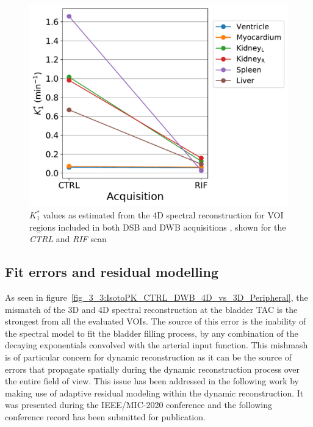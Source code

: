 \begin{figure} [h!]
\centering
\includegraphics[scale=0.5,angle=0]{3_Results/3_3_DWB_Reconstruction/figures/3_3_IsotoPK_K1_drop.pdf}
\caption{$K_1^{*}$ values as estimated from the 4D spectral reconstruction for VOI regions included in both DSB and DWB acquisitions , shown for the \textit{CTRL} and \textit{RIF} scan}
\label{fig_3_3:IsotoPK_K1_drop}
\end{figure} 

\subsection{Fit errors and residual modelling}
\label{sub_section:residuals}
As seen in figure~\ref{fig_3_3:IsotoPK_CTRL_DWB_4D_vs_3D_Peripheral}, the mismatch of the 3D and 4D spectral reconstruction at the bladder TAC is the strongest from all the evaluated VOIs. The source of this error is the inability of the spectral model to fit the bladder filling process, by any combination of the decaying exponentials convolved with the arterial input function. This mishmash is of particular concern for dynamic reconstruction as it can be the source of errors that propagate spatially during the dynamic reconstruction process over the entire field of view. 
This issue has been addressed in the following work by making use of adaptive residual modeling within the dynamic reconstruction. It was presented during the IEEE/MIC-2020 conference and the following conference record has been submitted for publication. 

\cleardoublepage

